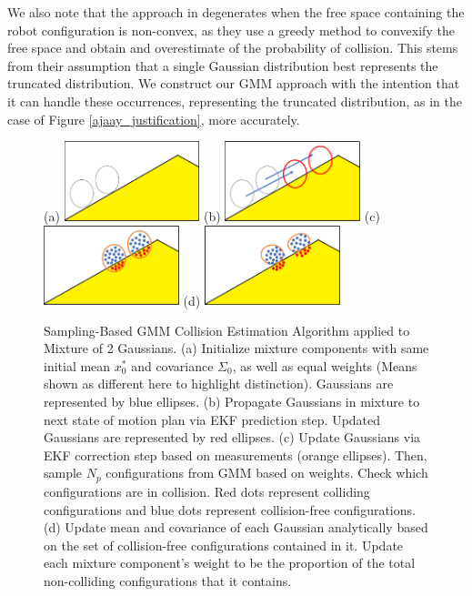 \documentclass[journal]{IEEEtran}
\begin{document}
We also note that the approach in \cite{IEEEhowto:patil} degenerates when the free space containing the robot configuration is non-convex, as they use a greedy method to convexify the free space and obtain and overestimate of the probability of collision. This stems from their assumption that a single Gaussian distribution best represents the truncated distribution. We construct our GMM approach with the intention that it can handle these occurrences, representing the truncated distribution, as in the case of Figure \ref{ajaay_justification}, more accurately.


\begin{figure}[!t]
\centering
\subfloat (a) {\includegraphics[width=1.55in]{step1.png}%
\label{step_one}}
\hfil
\subfloat (b) {\includegraphics[width=1.55in]{step2.png}%
\label{step_two}}
\hfil
\subfloat (c) {\includegraphics[width=1.55in]{step3.png}%
\label{step_three}}
\hfil
\subfloat (d) {\includegraphics[width=1.55in]{step4.png}%
\label{step_four}}
\caption{Sampling-Based GMM Collision Estimation Algorithm applied to Mixture of 2 Gaussians. (a) Initialize mixture components with same initial mean $x_0^*$ and covariance $\Sigma_0$, as well as equal weights (Means shown as different here to highlight distinction). Gaussians are represented by blue ellipses. (b) Propagate Gaussians in mixture to next state of motion plan via EKF prediction step. Updated Gaussians are represented by red ellipses. (c) Update Gaussians via EKF correction step based on measurements (orange ellipses). Then, sample $N_p$ configurations from GMM based on weights. Check which configurations are in collision. Red dots represent colliding configurations and blue dots represent collision-free configurations. (d) Update mean and covariance of each Gaussian analytically based on the set of collision-free configurations contained in it. Update each mixture component's weight to be the proportion of the total non-colliding configurations that it contains.}
\label{algorithm_steps}
\end{figure}
\end{document}

